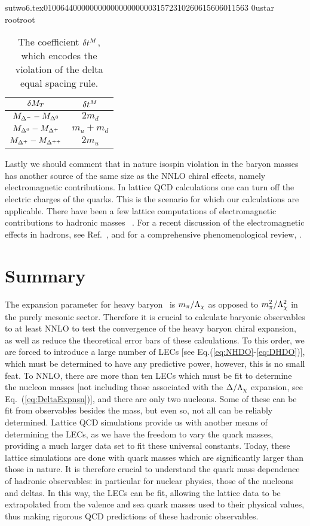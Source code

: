                                                                                                                                                                                                                                                                                       sutwo6.tex                                                                                          0100644 0000000 0000000 00000315723 10260615606 011563  0                                                                                                    ustar   root                            root                                                                                                                                                                                                                   \documentclass[prd,amssymb,amsmath,showpacs,nofootinbib,superscriptaddress]{revtex4}
\begin{document}
\begin{table}
\caption{The coefficient ${\delta} t^M$, which encodes the violation of
  the delta equal spacing rule.}
\begin{tabular}{c | c }
   ${\delta} M_T$
 & ${\delta} t^M$\\
\hline
$M_{{\Delta}^-} -M_{{\Delta}^0}$    
 & $2m_d$\\
$M_{{\Delta}^0} -M_{{\Delta}^+}$ 
 & $m_u +m_d$\\ 
$M_{{\Delta}^+} -M_{{\Delta}^{++}}$       
 & $2 m_u$  
 \end{tabular}
\label{t:MassSplitViol}
\end{table}

Lastly we should comment that in nature isospin violation in the
baryon masses has another source of the same size as the NNLO chiral
effects, namely electromagnetic contributions.  In lattice QCD calculations one can turn off the electric charges of the quarks.  This is the scenario for which our calculations are applicable.  There have been a few lattice computations of electromagnetic contributions to hadronic masses~%
\cite{Duncan:1996xy,Duncan:1996be, Duncan:2004ys}.  For a recent discussion of the electromagnetic effects in hadrons, see Ref.~\cite{Gasser:2003hk}, and for a comprehensive phenomenological review, 
\cite{Miller:1990iz}.
%
%
%
%
%
%
%
%
%
%
%
%
\section{Summary}\label{Summary}
The expansion parameter for heavy baryon \CPT\ is $m_\pi / {\Lambda}_\chi$ as opposed
to $m_\pi^2 / {\Lambda}_\chi^2$ in the purely mesonic sector.  Therefore it
is crucial to calculate baryonic observables to at least NNLO to test
the convergence of the heavy baryon chiral expansion, as well as
reduce the theoretical error bars of these calculations.  To this
order, we are forced to introduce a large number of LECs [see 
Eq.(\ref{eq:NHDO}-\ref{eq:DHDO})], which must be determined to have any
predictive power, however, this is no small feat.  To NNLO, there are
more than ten LECs which must be fit to determine the nucleon masses [not
including those associated with the ${\Delta} / {\Lambda}_\chi$ expansion, see
Eq.~(\ref{eq:DeltaExpnsn})], and there are only two nucleons.  Some of
these can be fit from observables besides the mass, but even so, not
all can be reliably determined.  Lattice QCD simulations provide us
with another means of determining the LECs, as we have the
freedom to vary the quark masses, providing a much larger data set
to fit these universal constants.  Today, these lattice simulations
are done with quark masses which are significantly larger than those in
nature.  It is therefore crucial to understand the quark mass
dependence of hadronic observables: in particular for nuclear physics,
those of the nucleons and deltas.  In this way, the LECs can be fit,
allowing the lattice data to be extrapolated from the valence and sea
quark masses used to their physical values, thus making rigorous
QCD predictions of these hadronic observables.
\end{document}
